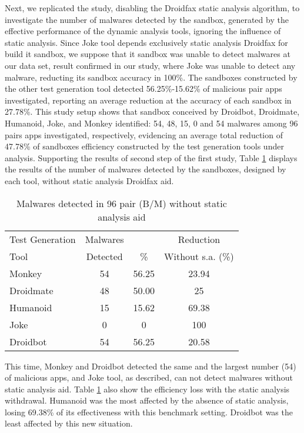 Next, we replicated the study, disabling the Droidfax static analysis algorithm, to investigate the number of malwares detected by the sandbox, generated by the effective performance of the dynamic analysis tools, ignoring the influence of static analysis. Since Joke tool depends exclusively static analysis Droidfax for build it sandbox, we suppose that it sandbox was unable to detect malwares at our data set, result confirmed in our study, where Joke was unable to detect any malware, reducting its sandbox accuracy in 100\%. The sandboxes constructed by the other test generation tool detected 56.25\%-15.62\% of malicious pair apps investigated, reporting an average reduction at the accuracy of each sandbox in 27.78\%. This study setup shows that sandbox conceived by Droidbot, Droidmate, Humanoid, Joke, and Monkey identified: 54, 48, 15, 0 and  54 malwares among 96 pairs apps investigated, respectively, evidencing an average total reduction of 47.78\% of sandboxes efficiency constructed by the test generation tools under analysis. Supporting the results of second step of the first study, Table \ref{tab:malwareWithout} displays the results of the number of malwares detected by the sandboxes, designed by each tool, without static analysis Droidfax aid. 

\begin{table}[ht]
\centering
\begin{tabular}{lccc}\toprule
 Test Generation & Malwares & & Reduction\\
 Tool & Detected & \% & Without s.a. (\%)\\ \midrule
 Monkey & 54 & 56.25 & 23.94\\
 Droidmate & 48 &  50.00 & 25 \\
 Humanoid & 15 & 15.62 & 69.38  \\
 Joke & 0 & 0 & 100 \\
 Droidbot & 54 & 56.25 & 20.58  \\\midrule
 
\end{tabular} 
\caption{Malwares detected in 96 pair (B/M) without static analysis aid}
\label{tab:malwareWithout}
\end{table}

This time, Monkey and Droidbot detected the same and the largest number (54) of malicious apps, and Joke tool, as described, can not detect malwares without static analysis aid. Table \ref{tab:malwareWithout} also show the efficiency loss with the static analysis withdrawal. Humanoid was the most affected by the absence of static analysis, losing 69.38\% of its effectiveness with this benchmark setting. Droidbot was the least affected by this new situation.

